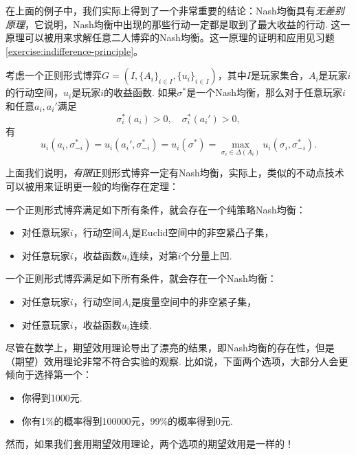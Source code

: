 在上面的例子中，我们实际上得到了一个非常重要的结论：Nash均衡具有\textit{无差别原理}，它说明，Nash均衡中出现的那些行动一定都是取到了最大收益的行动. 这一原理可以被用来求解任意二人博弈的Nash均衡。这一原理的证明和应用见习题 \ref{exercise:indifference-principle}。

\begin{theorem}[无差别原理]\label{thm:indifference-principle}
考虑一个正则形式博弈$G=(I,\{A_i\}_{i\in I},\{u_i\}_{i\in I})$，其中$I$是玩家集合，$A_i$是玩家$i$的行动空间，$u_i$是玩家$i$的收益函数. 如果$\sigma^*$是一个Nash均衡，那么对于任意玩家$i$和任意$a_i,a_i'$满足
\[\sigma^*_i(a_i)>0,\quad \sigma^*_i(a_i')>0,\]
有
\[u_i(a_i,\sigma^*_{-i})=u_i(a_i',\sigma^*_{-i})=u_i(\sigma^*)=\max_{\sigma_i\in\Delta(A_i)}u_i(\sigma_i,\sigma^*_{-i}).\]
\end{theorem}

上面我们说明，\textit{有限}正则形式博弈一定有Nash均衡，实际上，类似的不动点技术可以被用来证明更一般的均衡存在定理：

\begin{theorem}
    一个正则形式博弈满足如下所有条件，就会存在一个纯策略Nash均衡： 
    \begin{itemize}
        \item 对任意玩家$i$，行动空间$A_i$是Euclid空间中的非空紧凸子集，
        \item 对任意玩家$i$，收益函数$u_i$连续，对第$i$个分量上凹. 
    \end{itemize}
\end{theorem}

\begin{theorem}[Glicksberg定理]
    一个正则形式博弈满足如下所有条件，就会存在一个Nash均衡：
    \begin{itemize}
        \item 对任意玩家$i$，行动空间$A_i$是度量空间中的非空紧子集，
        \item 对任意玩家$i$，收益函数$u_i$连续. 
    \end{itemize}
\end{theorem}

尽管在数学上，期望效用理论导出了漂亮的结果，即Nash均衡的存在性，但是（期望）效用理论非常不符合实验的观察. 比如说，下面两个选项，大部分人会更倾向于选择第一个：
\begin{itemize}
    \item 你得到1000元.
    \item 你有1\%的概率得到100000元，99\%的概率得到0元.
\end{itemize}
然而，如果我们套用期望效用理论，两个选项的期望效用是一样的！

